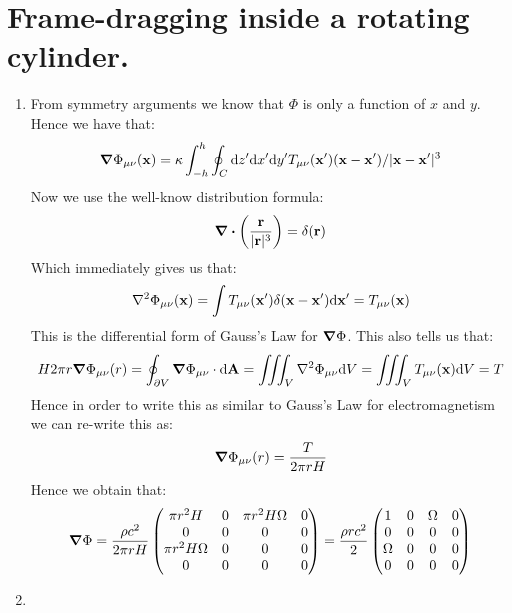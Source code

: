 \documentclass[10pt,a4paper]{article}
\begin{document}
\section{Frame-dragging inside a rotating cylinder.}

\begin{enumerate}

\item From symmetry arguments we know that $\Phi$ is only a function of $x$ and $y$. Hence we have that:
\[
\grad \Phi_{\mu \nu}(\vb{x}) = \kappa \int_{-h}^{h} \oint_C \dd z' \dd x' \dd y' T_{\mu \nu}(\vb{x}') (\vb{x} - \vb{x'})/|\vb{x} - \vb{x'}|^3 
\]
Now we use the well-know distribution formula:
\[
\div \left( \frac{\vb{r}}{|\vb{r}|^3} \right) = \delta(\vb{r})
\]
Which immediately gives us that:
\[
\laplacian \Phi_{\mu \nu}(\vb{x}) = \int T_{\mu \nu}(\vb{x'}) \delta(\vb{x} - \vb{x'}) \dd \vb{x'} = T_{\mu \nu}(\vb{x})
\]
This is the differential form of Gauss's Law for $\grad\Phi$. This also tells us that:
\[
H 2 \pi r \grad \Phi_{\mu \nu}(r) = \oint_{\partial V} \grad \Phi_{\mu \nu} \cdot \dd \vb{A} = \iiint_V \laplacian \Phi_{\mu \nu} \dd V = \iiint_V T_{\mu \nu}(\vb{x}) \dd V = T
\]
Hence in order to write this as similar to Gauss's Law for electromagnetism we can re-write this as:
\[
\grad \Phi_{\mu \nu}(r) = \frac{T}{2\pi r H}
\]
Hence we obtain that:
\[
\grad \Phi = \frac{\rho c^2}{2\pi r H} \begin{pmatrix}
\pi r^2 H & 0 & \pi r^2 H \Omega & 0\\
0 & 0 & 0 & 0\\
\pi r^2 H \Omega & 0 & 0 & 0\\
0 & 0 & 0 & 0
\end{pmatrix} = \frac{\rho r c^2}{2} \begin{pmatrix}
1 & 0 & \Omega & 0\\
0 & 0 & 0 & 0\\
\Omega & 0 & 0 & 0\\
0 & 0 & 0 & 0
\end{pmatrix}
\]


\item 

\end{enumerate}
\end{document}
